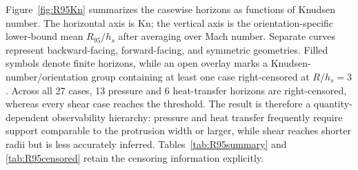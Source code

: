 \documentclass[aip,pof,preprint,notitlepage,floatfix,amsmath,amssymb]{revtex4-2}
\newcommand{\Kn}{\mathrm{Kn}}
\begin{document}
\begin{table}[t]
\centering
\caption{Closed-loop preservation of the model-conditional information footprint. $\Delta R_{95}$ is surrogate minus raw DSMC in units of $h_s$; $\Delta E_{\rm full}$ is the increase in full-domain relative error in percentage points. Brackets give 2.5--97.5 percentile intervals over 20 diagnostic random seeds.}
\label{tab:closedloop}
\scriptsize
{}
\end{table}

Figure~\ref{fig:R95Kn} summarizes the casewise horizons as functions of Knudsen number. The horizontal axis is $\Kn$; the vertical axis is the orientation-specific lower-bound mean $R_{95}/h_s$ after averaging over Mach number. Separate curves represent backward-facing, forward-facing, and symmetric geometries. Filled symbols denote finite horizons, while an open overlay marks a Knudsen-number/orientation group containing at least one case right-censored at $R/h_s=3$. Across all 27 cases, 13 pressure and 6 heat-transfer horizons are right-censored, whereas every shear case reaches the threshold. The result is therefore a quantity-dependent observability hierarchy: pressure and heat transfer frequently require support comparable to the protrusion width or larger, while shear reaches shorter radii but is less accurately inferred. Tables~\ref{tab:R95summary} and \ref{tab:R95censored} retain the censoring information explicitly.
\end{document}
